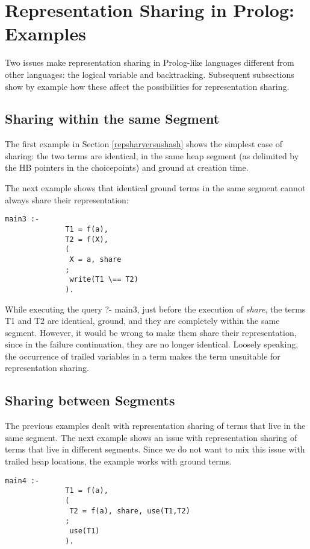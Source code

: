 \documentclass{tlp}
\begin{document}
\section{Representation Sharing in Prolog: Examples}\label{intuition}

Two issues make representation sharing in Prolog-like languages
different from other languages: the logical variable and backtracking.
Subsequent subsections show by example how these affect the
possibilities for representation sharing.


\subsection{Sharing within the same Segment}\label{samesegment}

The first example in Section \ref{repsharversushash} shows the 
simplest case of sharing: the two terms are identical, in the same heap
segment (as delimited by the HB pointers in the choicepoints) and
ground at creation time.

The next example shows that identical ground terms in the same segment
cannot always share their representation:
\begin{Verbatim}[fontsize=\small, frame=single,samepage=true]
       main3 :-
              T1 = f(a),
              T2 = f(X),
              (
               X = a, share
              ;
               write(T1 \== T2)
              ).
\end{Verbatim}
While executing the query ?- main3, just before the execution of {\em
share}, the terms T1 and T2 are identical, ground, and they are
completely within the same segment. However, it would be wrong to make
them share their representation, since in the failure continuation,
they are no longer identical. Loosely speaking, the occurrence of
trailed variables in a term makes the term unsuitable for representation
sharing.


\subsection{Sharing between Segments}

The previous examples dealt with representation sharing of terms that
live in the same segment. The next example shows an issue with
representation sharing of terms that live in different segments. Since
we do not want to mix this issue with trailed heap locations, the
example works with ground terms.


\begin{Verbatim}[fontsize=\small, frame=single,samepage=true]
       main4 :-
              T1 = f(a),
              (
               T2 = f(a), share, use(T1,T2)
              ;
               use(T1)
              ).
\end{Verbatim}
\end{document}
